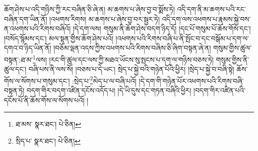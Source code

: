 ཆོག་ཤེས་པ་འདི་གཉིས་ཀྱི་རང་བཞིན་ཅི་ཞེ་ན། མ་ཆགས་པ་ཞེས་བྱ་བ་སྨོས་ཏེ། འདི་དག་ནི་མ་ཆགས་པའི་རང་བཞིན་དག་ཡིན་ནོ། །འཕགས་རིགས། མ་ཆགས་པ་ཞེས་བྱ་བར་སྦྱར་ཏེ། འདི་དག་ལས་འཕགས་པ་རྣམས་སྐྱེ་བས་ན་འཕགས་པའི་རིགས་བཞིའོ། །དེ་དག་ལས། གསུམ་ནི་ཆོག་ཤེས་བདག་ཉིད་དོ། །དང་པོ་གསུམ་པོ་ཆོས་གོས་དང་། །བསོད་སྙོམས་དང་། མལ་སྟན་གྱིས་ཆོག་ཤེས་པའོ། །འཕགས་པའི་རིགས་བཞི་པ་ནི་སྤོང་བ་དང་བསྒོམ་པ་དག་ལ་དགའ་བ་ཉིད་ཡིན་ནོ། །བཅོམ་ལྡན་འདས་ཀྱིས་འཕགས་པའི་རིགས་བཞིས་ཅི་ཞིག་བསྟན་ཞེ་ན། གསུམ་གྱིས་ཚུལ་བསྟན་:ཐ་མ་\footnote{ཐ་མས་  སྣར་ཐང་།  པེ་ཅིན། }ལས། །རང་གི་ཚུལ་དང་ལས་ཀྱི་མཐའ་ཡོངས་སུ་སྤངས་པ་དག་ལ་གཉིས་བཅས་ཏེ། གསུམ་གྱིས་ནི་ཚུལ་དང་། བཞི་པས་ནི་ལས་སོ། །བཅས་པ་དེ་ཡང་། སྲེད་པ་སྐྱེ་བའི་གཉེན་པོའི་ཕྱིར། །སྲེད་པ་སྐྱེ་བ་བཞི་སྟེ། ཆོས་གོས་ལ་སོགས་པ་གསུམ་དང་། :སྲེད་པ་\footnote{སྲིད་པ་  སྣར་ཐང་།  པེ་ཅིན། }མེད་པ་ལ་བཞི་པའོ། །དེ་དག་གི་གཉེན་པོར་འཕགས་པའི་རིགས་བཞི་བསྟན་ཏེ། བདག་གིར་བདག་འཛིན་དངོས་འདོད་པ། །དེ་ཡི་དུས་དང་གཏན་བཞིའི་ཕྱིར། །བདག་གིར་འཛིན་པའི་དངོས་པོ་ནི་ཆོས་གོས་ལ་སོགས་པའོ། །
